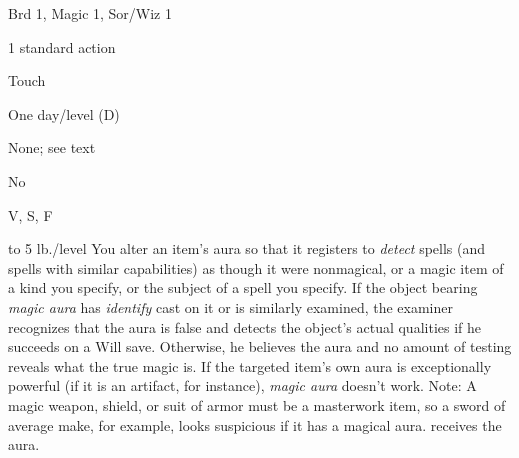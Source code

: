 
\begin{description*}
\item[Level:] Brd 1, Magic 1, Sor/Wiz 1
\item[Casting Time:] 1 standard action
\item[Range:] Touch
\item[Duration:] One day/level (D)
\item[Saving Throw:] None; see text
\item[Spell Resistance:] No
\item[Components:] V, S, F
\end{description*}

to 5 lb./level
You alter an item's aura so that it registers to \textit{detect} spells (and spells
with similar capabilities) as though it were nonmagical, or a magic item of a kind
you specify, or the subject of a spell you specify.
If the object bearing \textit{magic aura} has \textit{identify} cast on it or is
similarly examined, the examiner recognizes that the aura is false and detects
the object's actual qualities if he succeeds on a Will save. Otherwise, he believes
the aura and no amount of testing reveals what the true magic is.
If the targeted item's own aura is exceptionally powerful (if it is an artifact,
for instance), \textit{magic aura} doesn't work.
Note: A magic weapon, shield, or suit of armor must be a masterwork item,
so a sword of average make, for example, looks suspicious if it has a magical aura.
receives the aura.